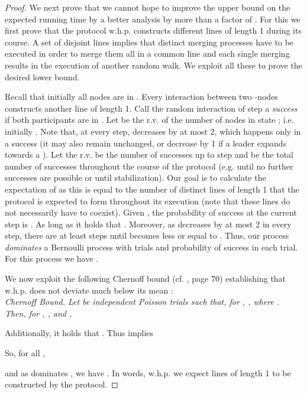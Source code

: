 \documentclass[oribibl, 11pt]{llncs}
\begin{document}
\begin{proof}
We next prove that we cannot hope to improve the upper bound on the expected running time by a better analysis by more than a factor of . For this we first prove that the protocol w.h.p. constructs  different lines of length 1 during its course. A set of  disjoint lines implies that  distinct merging processes have to be executed in order to merge them all in a common line and each single merging results in the execution of another random walk. We exploit all these to prove the desired  lower bound.

Recall that initially all nodes are in . Every interaction between two -nodes constructs another line of length 1. Call the random interaction of step  a \emph{success} if both participants are in . Let  be the r.v. of the number of nodes in state ; i.e. initially . Note that, at every step,  decreases by at most 2, which happens only in a success (it may also remain unchanged, or decrease by 1 if a leader expands towards a ). Let the r.v.  be the number of successes up to step  and  be the total number of successes throughout the course of the protocol (e.g. until no further successes are possible or until stabilization). Our goal is to calculate the expectation of  as this is equal to the number of distinct lines of length 1 that the protocol is expected to form throughout its execution (note that these lines do not necessarily have to coexist). Given , the probability of success at the current step is . As long as  it holds that . Moreover, as  decreases by at most 2 in every step, there are at least  steps until  becomes less or equal to . Thus, our process \emph{dominates} a Bernoulli process  with  trials and probability of success  in each trial. For this process we have .

We now exploit the following Chernoff bound (cf. \cite{MR95}, page 70) establishing that w.h.p.  does not deviate much below its mean :\\
\emph{
Chernoff Bound. Let  be independent Poisson trials such that, for , , where . Then, for , , and ,}


Additionally, it holds that . Thus  implies    


So, for all ,

and as  dominates , we have . In words, w.h.p. we expect  lines of length 1 to be constructed by the protocol.


\end{proof}
\end{document}
